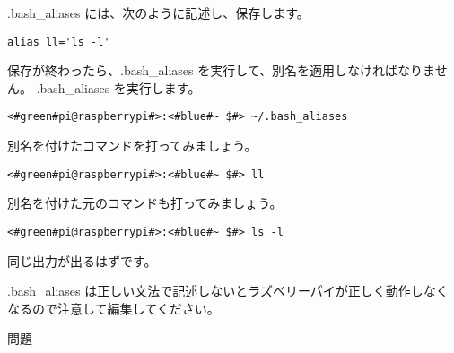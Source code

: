 .bash{\_}aliases には、次のように記述し、保存します。
\begin{lstlisting}[caption=.bashaliasesの中身, label=bashAliasesContents]
    alias ll='ls -l'
\end{lstlisting}

保存が終わったら、.bash{\_}aliases を実行して、別名を適用しなければなりません。
.bash{\_}aliases を実行します。
\begin{lstlisting}[caption=.bashaliasesを実行, label=executeBashAliases]
    <#green#pi@raspberrypi#>:<#blue#~ $#> ~/.bash_aliases
\end{lstlisting}

別名を付けたコマンドを打ってみましょう。
\begin{lstlisting}[caption=別名の確認, label=confirmAlias]
    <#green#pi@raspberrypi#>:<#blue#~ $#> ll
\end{lstlisting}

別名を付けた元のコマンドも打ってみましょう。
\begin{lstlisting}[caption=元のコマンドの確認, label=confirmCommand]
    <#green#pi@raspberrypi#>:<#blue#~ $#> ls -l
\end{lstlisting}

同じ出力が出るはずです。

.bash{\_}aliases は正しい文法で記述しないとラズベリーパイが正しく動作しなくなるので注意して編集してください。

問題
